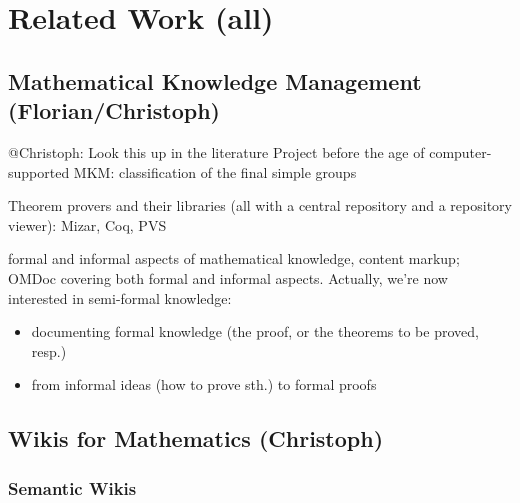 \section{Related Work (all)}
\label{sec:related}


\subsection{Mathematical Knowledge Management (Florian/Christoph)}
\label{sec:mkm}

\begin{todo}{@Christoph: Look this up in the literature}
Project before the age of computer-supported MKM: classification of the final simple groups
\end{todo}

Theorem provers and their libraries (all with a central repository and a repository
viewer): Mizar, Coq, PVS

formal and informal aspects of mathematical knowledge, content markup; OMDoc covering both
formal and informal aspects.  Actually, we're now interested in semi-formal
knowledge:
\begin{itemize}
\item documenting formal knowledge (the proof, or the theorems to be proved, resp.)
\item from informal ideas (how to prove sth.) to formal proofs
\end{itemize}

\subsection{Wikis for Mathematics (Christoph)}
\label{sec:math-wiki}

\subsubsection{Semantic Wikis}
\label{sec:semwiki}

